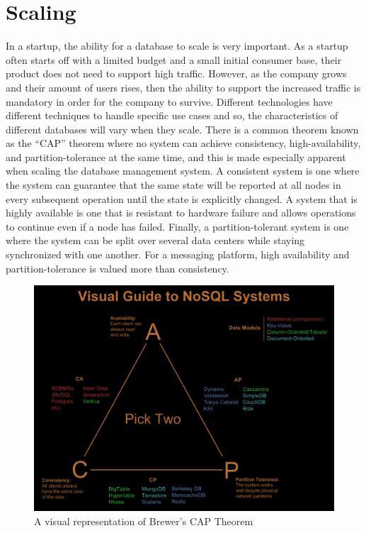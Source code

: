 \documentclass[12pt]{article}
\begin{document}
\section{Scaling}

In a startup, the ability for a database to scale is very important. As a startup often starts off with a limited budget and a small initial consumer base, their product does not need to support high traffic. However, as the company grows and their amount of users rises, then the ability to support the increased traffic is mandatory in order for the company to survive. Different technologies have different techniques to handle specific use cases and so, the characteristics of different databases will vary when they scale. There is a common theorem known as the ``CAP'' theorem where no system can achieve consistency, high-availability, and partition-tolerance at the same time, and this is made especially apparent when scaling the database management system. A consistent system is one where the system can guarantee that the same state will be reported at all nodes in every subsequent operation until the state is explicitly changed. A system that is highly available is one that is resistant to hardware failure and allows operations to continue even if a node has failed. Finally, a partition-tolerant system is one where the system can be split over several data centers while staying synchronized with one another. \cite{cap_theorem} For a messaging platform, high availability and partition-tolerance is valued more than consistency.

\begin{figure}
\begin{center}
        \includegraphics[scale=0.4]{resources/choose_two.png}
\end{center}
\caption{\label{figcaption} A visual representation of Brewer's CAP Theorem \cite{cap_picture}}
\end{figure}
\end{document}
